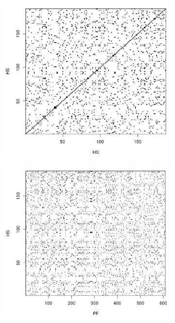 \documentclass[compress]{beamer}
\begin{document}
\begin{frame}
\begin{figure}[h!]
   \begin{subfigure}[b]{0.35\textwidth}
    \centering
    \includegraphics[width=1.0\textwidth]{hs-hs}
   \end{subfigure}
    \begin{subfigure}[b]{0.35\textwidth}
    \centering
    \includegraphics[width=1.0\textwidth]{hs-pf}
   \end{subfigure}
   

\end{figure}
\end{frame}
\end{document}
